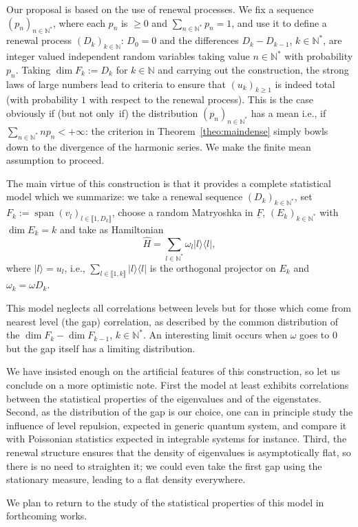 \documentclass[pdftex]{sigma}%
\DeclareMathOperator{\psan}{span}
\newcommand{\nN}{n\in \mathbb{N}}
\newcommand{\lN}{l\in \mathbb{N}}
\newcommand{\kN}{k\in \mathbb{N}}
\newcommand{\intt}[1]{\llbracket #1 \rrbracket}
\begin{document}
Our proposal is based on the use of renewal processes. We fix a sequence $(p_n)_{\nN ^*}$, where each $p_n$ is $\geq 0$ and $\sum_{\nN ^*} p_n=1$, and use it to define a renewal process $(D_k)_{\kN}$: $D_0=0$ and the differences $D_k - D_{k-1}$, $\kN ^*$, are integer valued independent random variables taking value $\nN ^*$ with probability $p_n$. Taking $\dim F_k:=D_k$ for $\kN$ and carrying out the construction, the strong laws of large numbers lead to criteria to ensure that $(u_k)_{k\geq 1}$ is indeed total (with probability $1$ with respect to the renewal process). This is the case obviously if (but not only~if) the distribution $(p_n)_{\nN ^*}$ has a mean i.e., if $\sum_{\nN ^*} n p_n < +\infty$: the criterion in Theorem~\ref{theo:maindense} simply bowls down to the divergence of the harmonic series. We make the finite mean assumption to proceed.

The main virtue of this construction is that it provides a complete statistical model which we summarize: we take a renewal sequence $(D_k)_{\kN^*}$, set $F_k:=\psan (v_l)_{l\in \intt{1,D_k}}$, choose a random Matryoshka in $\underline{F}$, $(E_k)_{\kN^*}$ with $\dim E_k=k$ and take as Hamiltonian
\[
\hat{H}=\sum_{\lN^*} \omega_l |l\rangle \langle l|,
\] where $|l\rangle=u_l$, i.e., $\sum_{l\in \intt{1,k}}|l\rangle \langle l|$ is the orthogonal projector on $E_k$ and $\omega_k=\omega D_k$.

This model neglects all correlations between levels but for those which come from nearest level (the gap) correlation, as described by the common distribution of the $\dim F_k - \dim F_{k-1}$, $\kN ^*$. An interesting limit occurs when $\omega$ goes to $0$ but the gap itself has a limiting distribution.

We have insisted enough on the artificial features of this construction, so let us conclude on a more optimistic note. First the model at least exhibits correlations between the statistical properties of the eigenvalues and of the eigenstates. Second, as the distribution of the gap is our choice, one can in principle study the influence of level repulsion, expected in generic quantum system, and compare it with Poissonian statistics expected in integrable systems for instance. Third, the renewal structure ensures that the density of eigenvalues is asymptotically flat, so there is no need to straighten it; we could even take the first gap using the stationary measure, leading to a flat density everywhere.

We plan to return to the study of the statistical properties of this model in forthcoming works.
\end{document}
